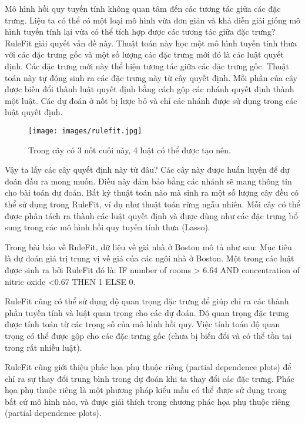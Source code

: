 Mô hình hồi quy tuyến tính không quan tâm đến các tương tác giữa các đặc trưng. Liệu ta có thể có một loại mô hình vừa đơn giản và khả diễn giải giống mô hình tuyến tính lại vừa có thể tích hợp được các tương tác giữa đặc trưng? RuleFit giải quyết vấn đề này. Thuật toán này học một mô hình tuyến tính thưa với các đặc trưng gốc và một số lượng các đặc trưng mới đó là các luật quyết định. Các đặc trưng mới này thể hiện tương tác giữa các đặc trưng gốc. Thuật toán này tự động sinh ra các đặc trưng này từ cây quyết định. Mỗi phần của cây được biến đổi thành luật quyết định bằng cách gộp các nhánh quyết định thành một luật. Các dự đoán ở nốt bị lược bỏ và chỉ các nhánh được sử dụng trong các luật quyết định.

\begin{figure*}[h!]
	\centering
	\texttt{[image: images/rulefit.jpg]}
	\label{fig:4_21}
	\caption{Trong cây có 3 nốt cuối này, 4 luật có thể được tạo nên.}
	
\end{figure*}

Vậy ta lấy các cây quyết định này từ đâu? Các cây này được huấn luyện để dự đoán đầu ra mong muốn. Điều này đảm bảo bằng các nhánh sẽ mang thông tin cho bài toán dự đoán. Bất kỳ thuật toán nào mà sinh ra một số lượng cây đều có thể sử dụng trong RuleFit, ví dụ như thuật toán rừng ngẫu nhiên. Mỗi cây có thể được phân tách ra thành các luật quyết định và được dùng như các đặc trưng bổ sung trong các mô hình hồi quy tuyến tính thưa (Lasso).

Trong bài báo về RuleFit, dữ liệu về giá nhà ở Boston mô tả như sau: Mục tiêu là dự đoán giá trị trung vị về giá của các ngôi nhà ở Boston. Một trong các luật được sinh ra bởi RuleFit đó là: IF number of rooms > 6.64 AND concentration of nitric oxide <0.67 THEN 1 ELSE 0.

RuleFit cũng có thể sử dụng độ quan trọng đặc trưng để giúp chỉ ra các thành phần tuyến tính và luật quan trọng cho các dự đoán. Độ quan trọng đặc trưng được tính toán từ các trọng số của mô hình hồi quy. Việc tính toán độ quan trọng có thể được gộp cho các đặc trưng gốc (chưa bị biến đổi và có thể tồn tại trong rất nhiều luật).

RuleFit cũng giới thiệu phác họa phụ thuộc riêng (partial dependence plots) để chỉ ra sự thay đổi trung bình trong dự đoán khi ta thay đổi các đặc trưng. Phác họa phụ thuộc riêng là một phương pháp kiểu mẫu có thể được sử dụng trong bất cứ mô hình nào, và được giải thích trong chương phác họa phụ thuộc riêng (partial dependence plots).

